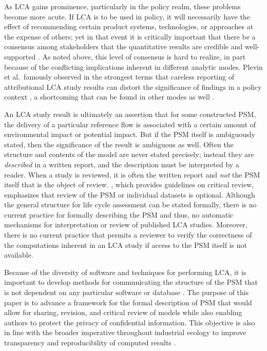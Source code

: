 As LCA gains prominence, particularly in the policy realm, these problems become more acute.  If LCA is to be used in policy, it will necessarily have the effect of recommending certain product systems, technologies, or approaches at the expense of others; yet in that event it is critically important that there be a consensus among stakeholders that the quantitative results are credible and well-supported \citep{Rainville_2015, McManus_2015}.  As noted above, this level of consensus is hard to realize, in part because of the conflicting implications inherent in different analytic modes.
Plevin et al.\ famously observed in the strongest terms that careless reporting of attributional LCA study results can distort the significance of findings in a policy context \citep{Plevin_2013}, a shortcoming that can be found in other modes as well \citep{Brandao_2014}.  

An LCA study result is ultimately an assertion that for some constructed PSM, the delivery of a particular reference flow is associated with a certain amount of environmental impact or potential impact.  But if the PSM itself is ambiguously stated, then the significance of the result is ambiguous as well.  Often the structure and contents of the model are never stated precisely; instead they are \emph{described} in a written report, and the description must be interpreted by a reader.  When a study is reviewed, it is often the written report and \emph{not} the PSM itself that is the object of review.  \cite{iso14071}, which provides guidelines on critical review, emphasizes that review of the PSM or individual datasets is optional.  
Although the general structure for life cycle assessment can be stated formally, there is no current practice for formally describing the PSM and thus, no automatic mechanisms for interpretation or review of published LCA studies.  Moreover, there is no current practice that permits a reviewer to verify the correctness of the computations inherent in an LCA study if access to the PSM itself is not available.  

Because of the diversity of software and techniques for performing LCA, it is important to develop methods for communicating the structure of the PSM that is not dependent on any particular software or database \citep{Kuczenski_JLCA_2018}.    The purpose of this paper is to advance a framework for the formal description of PSM that would allow for sharing, revision, and critical review of models while also enabling authors to protect the privacy of confidential information.  This objective is also in line with the broader imperative throughout industrial ecology to improve transparency and reproducibility of computed results \citep{Hertwich_JIE_2018}.  

